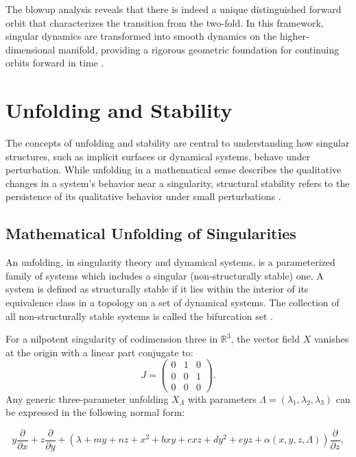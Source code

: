 \documentclass[12pt, a4paper, oneside]{book}
\theoremstyle{plain}
\theoremstyle{definition}
\theoremstyle{remark}
\theoremstyle{definition}
\begin{document}
The blowup analysis reveals that there is indeed a unique distinguished forward orbit that characterizes the transition from the two-fold. In this framework, singular dynamics are transformed into smooth dynamics on the higher-dimensional manifold, providing a rigorous geometric foundation for continuing orbits forward in time \cite{kristiansen2019resolution}.

\section{Unfolding and Stability}
\label{sec:unfolding}

The concepts of unfolding and stability are central to understanding how singular structures, such as implicit surfaces or dynamical systems, behave under perturbation. While unfolding in a mathematical sense describes the qualitative changes in a system's behavior near a singularity, structural stability refers to the persistence of its qualitative behavior under small perturbations \cite{ibanez2005shil}.

\subsection{Mathematical Unfolding of Singularities}

An unfolding, in singularity theory and dynamical systems, is a parameterized family of systems which includes a singular (non-structurally stable) one. A system is defined as structurally stable if it lies within the interior of its equivalence class in a topology on a set of dynamical systems. The collection of all non-structurally stable systems is called the bifurcation set \cite{ibanez2005shil}.

For a nilpotent singularity of codimension three in $\mathbb{R}^3$, the vector field $X$ vanishes at the origin with a linear part conjugate to:
\begin{equation}
    J = \begin{pmatrix} 0 & 1 & 0 \\ 0 & 0 & 1 \\ 0 & 0 & 0 \end{pmatrix}.
\end{equation}
Any generic three-parameter unfolding $X_\Lambda$ with parameters $\Lambda = (\lambda_1, \lambda_2, \lambda_3)$ can be expressed in the following normal form:

\begin{equation}
    y \frac{\partial}{\partial x} + z \frac{\partial}{\partial y} + (\lambda + my + nz + x^2 + bxy + cxz + dy^2 + eyz + \alpha(x, y, z, \Lambda)) \frac{\partial}{\partial z},
\end{equation}
\end{document}
